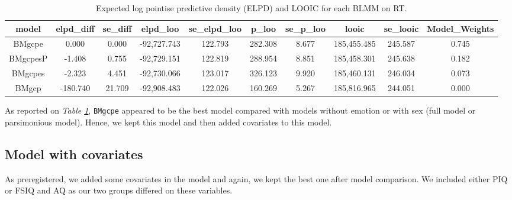\documentclass[
  11pt,
  english,
  ,doc,floatsintext]{apa6}
\begin{document}
\begin{table}[htb]

\begin{center}
\begin{threeparttable}

\caption{\label{tab:modelComp1RT}Expected log pointise predictive density (ELPD) and LOOIC for each BLMM on RT.}

\tiny{

\begin{tabular}{cccccccccc}
\toprule
model & \multicolumn{1}{c}{elpd\_diff} & \multicolumn{1}{c}{se\_diff} & \multicolumn{1}{c}{elpd\_loo} & \multicolumn{1}{c}{se\_elpd\_loo} & \multicolumn{1}{c}{p\_loo} & \multicolumn{1}{c}{se\_p\_loo} & \multicolumn{1}{c}{looic} & \multicolumn{1}{c}{se\_looic} & \multicolumn{1}{c}{Model\_Weights}\\
\midrule
BMgcpe & 0.000 & 0.000 & -92,727.743 & 122.793 & 282.308 & 8.677 & 185,455.485 & 245.587 & 0.745\\
BMgcpesP & -1.408 & 0.755 & -92,729.151 & 122.819 & 288.954 & 8.851 & 185,458.301 & 245.638 & 0.182\\
BMgcpes & -2.323 & 4.451 & -92,730.066 & 123.017 & 326.123 & 9.920 & 185,460.131 & 246.034 & 0.073\\
BMgcp & -180.740 & 21.709 & -92,908.483 & 122.026 & 160.269 & 5.267 & 185,816.965 & 244.051 & 0.000\\
\bottomrule
\end{tabular}

}

\end{threeparttable}
\end{center}

\end{table}

As reported on \emph{Table \ref{tab:modelComp1RT}}, \texttt{BMgcpe} appeared to be the best model compared with models without emotion or with sex (full model or parsimonious model). Hence, we kept this model and then added covariates to this model.

\hypertarget{model-with-covariates}{%
\subsection{Model with covariates}\label{model-with-covariates}}

As preregistered, we added some covariates in the model and again, we kept the best one after model comparison. We included either PIQ or FSIQ and AQ as our two groups differed on these variables.
\end{document}
